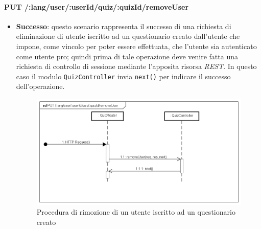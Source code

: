 \paragraph{PUT /:lang/user/:userId/quiz/:quizId/removeUser} %
\begin{itemize}
\item \textbf{Successo}: questo scenario rappresenta il successo di una richiesta di eliminazione di utente iscritto ad un questionario creato dall'utente che impone, come vincolo per poter essere effettuata, che l'utente sia autenticato come utente pro; quindi prima di tale operazione deve venire fatta una richiesta di controllo di sessione mediante l'apposita risorsa \textit{REST}. In questo caso il modulo \texttt{QuizController} invia \texttt{next()} per indicare il successo dell'operazione.
\label{Procedura di rimozione di utente iscritto ad un questionario}
\begin{figure}[ht]
	\centering
	\includegraphics[scale=0.50]{UML/DiagrammiDiSequenza/Back-end/PUT_lang_user__userId_quiz__quizIdRemoveUserSuccess.png}
	\caption{Procedura di rimozione di un utente iscritto ad un questionario creato}
\end{figure}
\FloatBarrier


\end{itemize}
